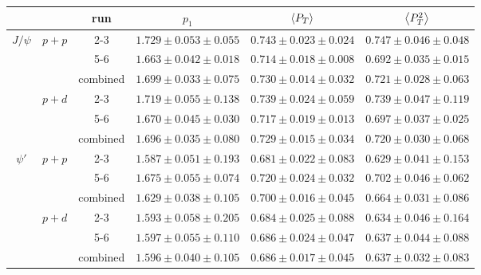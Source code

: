 \begin{tabular}{cc|c|c|c|c}
\hline
                      &                        & run      & $p_1$                   & $\expval{P_T}$          & $\expval{P^2_T}$        \\ \hline
\multicolumn{1}{c|}{\multirow{6}{*}{$J/\psi$}} & \multirow{3}{*}{$p+p$} & 2-3 & $1.729\pm0.053\pm0.055$ & $0.743\pm0.023\pm0.024$ & $0.747\pm0.046\pm0.048$ \\ \cline{3-6} 
\multicolumn{1}{c|}{} &                        & 5-6      & $1.663\pm0.042\pm0.018$ & $0.714\pm0.018\pm0.008$ & $0.692\pm0.035\pm0.015$ \\ \cline{3-6} 
\multicolumn{1}{c|}{} &                        & combined & $1.699\pm0.033\pm0.075$ & $0.730\pm0.014\pm0.032$ & $0.721\pm0.028\pm0.063$ \\ \cline{2-6} 
\multicolumn{1}{c|}{} & \multirow{3}{*}{$p+d$} & 2-3      & $1.719\pm0.055\pm0.138$ & $0.739\pm0.024\pm0.059$ & $0.739\pm0.047\pm0.119$ \\ \cline{3-6} 
\multicolumn{1}{c|}{} &                        & 5-6      & $1.670\pm0.045\pm0.030$ & $0.717\pm0.019\pm0.013$ & $0.697\pm0.037\pm0.025$ \\ \cline{3-6} 
\multicolumn{1}{c|}{} &                        & combined & $1.696\pm0.035\pm0.080$ & $0.729\pm0.015\pm0.034$ & $0.720\pm0.030\pm0.068$ \\ \hline
\multicolumn{1}{c|}{\multirow{6}{*}{$\psi'$}}  & \multirow{3}{*}{$p+p$} & 2-3 & $1.587\pm0.051\pm0.193$ & $0.681\pm0.022\pm0.083$ & $0.629\pm0.041\pm0.153$ \\ \cline{3-6} 
\multicolumn{1}{c|}{} &                        & 5-6      & $1.675\pm0.055\pm0.074$ & $0.720\pm0.024\pm0.032$ & $0.702\pm0.046\pm0.062$ \\ \cline{3-6} 
\multicolumn{1}{c|}{} &                        & combined & $1.629\pm0.038\pm0.105$ & $0.700\pm0.016\pm0.045$ & $0.664\pm0.031\pm0.086$ \\ \cline{2-6} 
\multicolumn{1}{c|}{} & \multirow{3}{*}{$p+d$} & 2-3      & $1.593\pm0.058\pm0.205$ & $0.684\pm0.025\pm0.088$ & $0.634\pm0.046\pm0.164$ \\ \cline{3-6} 
\multicolumn{1}{c|}{} &                        & 5-6      & $1.597\pm0.055\pm0.110$ & $0.686\pm0.024\pm0.047$ & $0.637\pm0.044\pm0.088$ \\ \cline{3-6} 
\multicolumn{1}{c|}{} &                        & combined & $1.596\pm0.040\pm0.105$ & $0.686\pm0.017\pm0.045$ & $0.637\pm0.032\pm0.083$ \\ \hline
\end{tabular}
